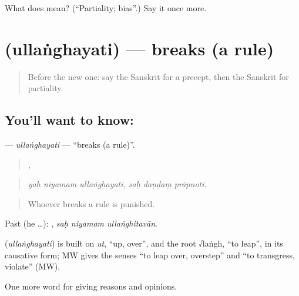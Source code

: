 \begin{tcolorbox}[breakable,colback=teal!4,colframe=teal!35!black,title={Before you move on}]
What does  mean? (\textquotedblleft{}Partiality; bias\textquotedblright{}.) Say it once more.
\end{tcolorbox}
\section[\texorpdfstring{\sk{उल्लंघयति} (ullaṅghayati)}{उल्लंघयति (ullaṅghayati)}]{ (ullaṅghayati) — breaks (a rule)}

\label{lesson:SA-C348-ullanghayati}



\begin{quote}
Before the new one: say the Sanskrit for a precept, then the Sanskrit for partiality.
\end{quote}

\subsection*{You'll want to know: }
\textbf{} — \emph{ullaṅghayati} — \textquotedblleft{}breaks (a rule)\textquotedblright{}.

\begin{quote}
  ,   
\end{quote}

\begin{quote}
\emph{yaḥ niyamam ullaṅghayati, saḥ daṇḍaṃ prāpnoti.}
\end{quote}

\begin{quote}
Whoever breaks a rule is punished.
\end{quote}

Past (he …):   , \emph{saḥ niyamam ullaṅghitavān}.

\begin{cousinweb}
\textbf{} (\emph{ullaṅghayati}) is built on \emph{ut}, \textquotedblleft{}up, over\textquotedblright{}, and the root √laṅgh, \textquotedblleft{}to leap\textquotedblright{}, in its causative form; MW gives the senses \textquotedblleft{}to leap over, overstep\textquotedblright{} and \textquotedblleft{}to transgress, violate\textquotedblright{} (MW).
\end{cousinweb}

\begin{grammarlens}[title={What you've built}]
One more word for giving reasons and opinions.
\end{grammarlens}

